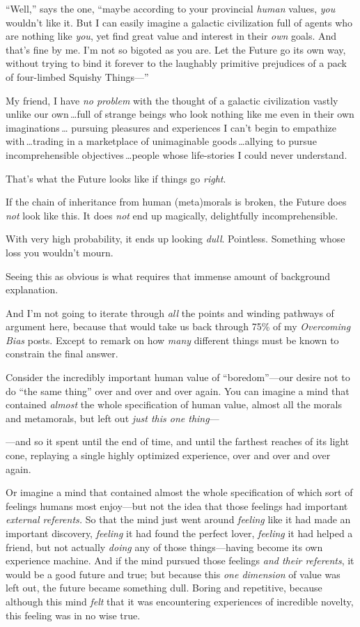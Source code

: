  ``Well,'' says the one,
``maybe according to your provincial \textit{human}
values, \textit{you} wouldn't like it. But I can easily
imagine a galactic civilization full of agents who are nothing like
\textit{you}, yet find great value and interest in their \textit{own}
goals. And that's fine by me. I'm not
so bigoted as you are. Let the Future go its own way, without trying to
bind it forever to the laughably primitive prejudices of a pack of
four-limbed Squishy Things---''


 My friend, I have \textit{no problem} with the thought of a
galactic civilization vastly unlike our own\,\ldots full of strange
beings who look nothing like me even in their own imaginations\,\ldots
pursuing pleasures and experiences I can't begin to
empathize with\,\ldots trading in a marketplace of unimaginable goods\,\ldots allying to pursue incomprehensible objectives\,\ldots people whose
life-stories I could never understand.


 That's what the Future looks like if things go
\textit{right}.


 If the chain of inheritance from human (meta)morals is broken, the
Future does \textit{not} look like this. It does \textit{not} end up
magically, delightfully incomprehensible.


 With very high probability, it ends up looking \textit{dull}.
Pointless. Something whose loss you wouldn't mourn.


 Seeing this as obvious is what requires that immense amount of
background explanation.


 And I'm not going to iterate through \textit{all}
the points and winding pathways of argument here, because that would
take us back through 75\% of my \textit{Overcoming Bias} posts. Except
to remark on how \textit{many} different things must be known to
constrain the final answer.


 Consider the incredibly important human value of
``boredom''{}---our desire not to do
``the same thing'' over and over and
over again. You can imagine a mind that contained \textit{almost} the
whole specification of human value, almost all the morals and
metamorals, but left out \textit{just this one thing}{}---


 {}---and so it spent until the end of time, and until the farthest
reaches of its light cone, replaying a single highly optimized
experience, over and over and over again.


 Or imagine a mind that contained almost the whole specification of
which sort of feelings humans most enjoy---but not the idea that those
feelings had important \textit{external referents.} So that the mind
just went around \textit{feeling} like it had made an important
discovery, \textit{feeling} it had found the perfect lover,
\textit{feeling} it had helped a friend, but not actually
\textit{doing} any of those things---having become its own experience
machine. And if the mind pursued those feelings \textit{and their
referents}, it would be a good future and true; but because this
\textit{one dimension} of value was left out, the future became
something dull. Boring and repetitive, because although this mind
\textit{felt} that it was encountering experiences of incredible
novelty, this feeling was in no wise true.


